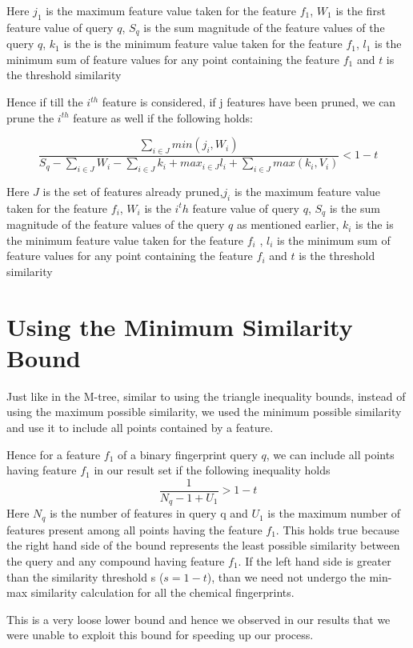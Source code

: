 Here $j_1$ is the maximum feature value taken for the feature $f_1$, $W_1$ is the first feature value of query $q$, $S_q$ is the sum magnitude of the feature values of the query $q$, $k_1$ is the is the minimum feature value taken for the feature $f_1$, $l_1$ is the minimum sum of feature values for any point containing the feature $f_1$ and $t$ is the threshold similarity

Hence if till the $i^{th}$ feature is considered, if j features have been pruned, we can prune the $i^{th}$ feature as well if the following holds:
		

\[\frac{\sum\limits_{i \in J}min(j_i,W_i)}{S_q - \sum\limits_{i \in J}W_i -\sum\limits_{i \in J}k_i + max_{i \in J}l_i + \sum\limits_{i \in J}max (k_i, V_i)}  < 1-t\]
	
Here $J$ is the set of features already pruned,$j_i$ is the maximum feature value taken for the feature $f_i$, $W_i$ is the $i^th$ feature value of query $q$, $S_q$ is the sum magnitude of the feature values of the query $q$ as mentioned earlier, $k_i$ is the is the minimum feature value taken for the feature $f_i$ , $l_i$ is the minimum sum of feature values for any point containing the feature $f_i$ and $t$ is the threshold similarity




\section{Using the Minimum Similarity Bound}

Just like in the M-tree, similar to using the triangle inequality bounds, instead of using the maximum possible similarity, we used the minimum possible similarity and use it to include all points contained by a feature.

Hence for a feature $f_1$ of a binary fingerprint query $q$, we can include all points having feature $f_1$ in our result set if the following inequality holds
	\[\frac{1}{N_q - 1 + U_{1}}  > 1-t\]
Here $N_q$ is the number of features in query q and $U_{1}$ is the maximum number of features present among all points having the feature $f_1$. This holds true because the right hand side of the bound represents the least possible similarity between the query and any compound having feature $f_1$. If the left hand side is greater than the similarity threshold s ($s=1-t$), than we need not undergo the min-max similarity calculation for all the chemical fingerprints.

This is a very loose lower bound and hence we observed in our results that we were unable to exploit this bound for speeding up our process.
	


